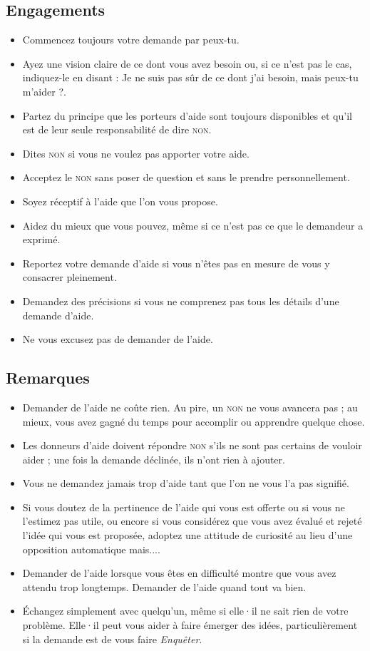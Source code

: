 \documentclass[11pt]{book}
\begin{document}
\subsection{Engagements}
\begin{itemize}
	\item Commencez toujours votre demande par \og{}peux-tu\fg{}.
	\item Ayez une vision claire de ce dont vous avez besoin ou, si ce n'est pas le cas, indiquez-le en disant : \og{}Je ne suis pas sûr
	      de ce dont j'ai besoin, mais peux-tu m'aider ?\fg{}.
    \item Partez du principe que les porteurs d'aide sont toujours disponibles et qu'il est de leur seule responsabilité de dire \textsc{non}.
    \item Dites \textsc{non} si vous ne voulez pas apporter votre aide.
    \item Acceptez le \textsc{non} sans poser de question et sans le prendre personnellement.
    \item Soyez réceptif à l'aide que l'on vous propose.
    \item Aidez du mieux que vous pouvez, même si ce n'est pas ce que le demandeur a exprimé.
    \item Reportez votre demande d'aide si vous n'êtes pas en mesure de vous y consacrer pleinement.
    \item Demandez des précisions si vous ne comprenez pas tous les détails d'une demande d'aide.
    \item Ne vous excusez pas de demander de l'aide.
\end{itemize}

\subsection{Remarques}
\begin{itemize}
	\item Demander de l'aide ne coûte rien. Au pire, un \textsc{non} ne vous avancera pas ; au mieux, vous avez gagné du temps pour
	      accomplir ou apprendre quelque chose.
	\item Les donneurs d'aide doivent répondre \textsc{non} s'ils ne sont pas certains de vouloir aider ; une fois la demande déclinée,
	      ils n'ont rien à ajouter.
	\item Vous ne demandez jamais \og{}trop\fg{} d'aide tant que l'on ne vous l'a pas signifié.
	\item Si vous doutez de la pertinence de l'aide qui vous est offerte ou si vous ne l'estimez pas utile, ou encore si vous considérez
	      que vous avez évalué et rejeté l'idée qui vous est proposée, adoptez une attitude de curiosité au lieu d'une opposition automatique
	      \og{}mais...\fg{}.
	\item Demander de l'aide lorsque vous êtes en difficulté montre que vous avez attendu trop longtemps. Demander de l'aide quand tout va bien.
	\item Échangez simplement avec quelqu'un, même si elle·il ne sait rien de votre problème. Elle·il peut vous aider à faire émerger des idées,
	      particulièrement si la demande est de vous faire \emph{Enquêter}.
\end{itemize}
\end{document}
